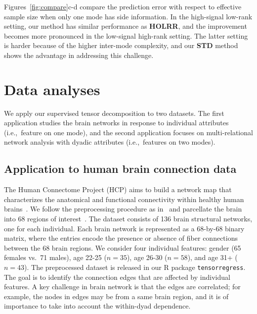 \documentclass[12pt]{article}
\theoremstyle{definition}
\theoremstyle{definition}
\begin{document}
Figures~\ref{fig:compare}c-d compare the prediction error with respect to effective sample size when only one mode has side information. In the high-signal low-rank setting, our method has similar performance as {\bf HOLRR}, and the improvement becomes more pronounced in the low-signal high-rank setting. The latter setting is harder because of the higher inter-mode complexity, and our {\bf STD} method shows the advantage in addressing this challenge. 


\section{Data analyses}\label{sec:data}
We apply our supervised tensor decomposition to two datasets. The first application studies the brain networks in response to individual attributes (i.e.,\ feature on one mode), and the second application focuses on multi-relational network analysis with dyadic attributes (i.e.,\ features on two modes). 

\subsection{Application to human brain connection data}
The Human Connectome Project (HCP) aims to build a network map that characterizes the anatomical and functional connectivity within healthy human brains~\citep{HCP}. 
We follow the preprocessing procedure as in~\cite{zhang2018mapping} and parcellate the brain into 68 regions of interest~\citep{desikan2006automated}. The dataset consists of 136 brain structural networks, one for each individual. Each brain network is represented as a 68-by-68 binary matrix, where the entries encode the presence or absence of fiber connections between the 68 brain regions. We consider four individual features: gender (65 females vs.\ 71 males), age 22-25 ($n=35$), age 26-30 ($n=58$), and age 31+ ($n=43$). The preprocessed dataset is released in our R package \texttt{tensorregress}. The goal is to identify the connection edges that are affected by individual features. A key challenge in brain network is that the edges are correlated; for example, the nodes in edges may be from a same brain region, and it is of importance to take into account the within-dyad dependence. 
\end{document}
